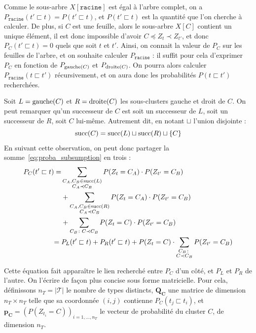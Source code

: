 Comme le sous-arbre $X[\texttt{racine}]$ est égal à l'arbre complet, on a $P_\texttt{racine}(t' \sqsubset t) = P(t' \sqsubset t)$, et $P(t' \sqsubset t)$ est la quantité que l'on cherche à calculer. De plus, si $C$ est une feuille, alors le sous-arbre $X[C]$ contient un unique élément, il est donc impossible d'avoir $C \preceq Z_t \prec Z_{t'}$, et donc $P_C(t' \sqsubset t) = 0$ quels que soit $t$ et $t'$. 
Ainsi, on connait la valeur de $P_C$ sur les feuilles de l'arbre, et on souhaite calculer $P_\texttt{racine}$ : il suffit pour cela d'exprimer $P_C$ en fonction de $P_{\operatorname{gauche}(C)}$ et $P_{\operatorname{droite}(C)}$. On pourra alors calculer $P_\texttt{racine}(t \sqsubset t')$ récursivement, et on aura donc les probabilités $P(t \sqsubset t')$ recherchées.

Soit $L = \operatorname{gauche}(C)$ et $R = \operatorname{droite}(C)$ les sous-clusters gauche et droit de $C$. On peut remarquer qu'un successeur de $C$ est soit un successeur de $L$, soit un successeur de $R$, soit $C$ lui-même. Autrement dit, en notant $\sqcup$ l'union disjointe :
\begin{equation}
    \operatorname{succ}(C) = \operatorname{succ}(L) \sqcup \operatorname{succ}(R) \sqcup \{ C\}
\end{equation}
En suivant cette observation, on peut donc partager la somme~\ref{eq:proba_subsumption} en trois :
\begin{align}
P_{C}(t' \sqsubset t) = 
&
\sum_{\substack{C_A, C_B \in \operatorname{succ}(L) \\  C_A \prec C_B}} P(Z_t = C_A)\cdot P(Z_{t'} = C_B) 
\nonumber \\ 
&+ 
\sum_{\substack{C_A, C_B \in \operatorname{succ}(R) \\  C_A \prec C_B}} P(Z_t = C_A)\cdot P(Z_{t'} = C_B) 
\nonumber \\
&+ \displaystyle \sum_{C_B \colon C \prec C_B} P(Z_t = C) \cdot P(Z_{t'} = C_B) \nonumber \\
= {} & P_{L}(t' \sqsubset t) + P_{R}(t' \sqsubset t)  + P(Z_t=C)\cdot\sum_{\substack{C_B \colon \\ C\prec C_B}} P(Z_{t'} = C_B)
\label{eq:proba_over_subtree}
\end{align}

Cette équation fait apparaître le lien recherché entre $P_C$ d'un côté, et $P_L$ et $P_R$ de l'autre. On l'écrire de façon plus concise sous forme matricielle. Pour cela, définissons $n_T = | \mathcal{T} |$ le nombre de types distincts, $\mathbf{Q_C}$ une matrice de dimension $n_T \times n_T$ telle que sa coordonnée $(i, j)$ contienne $P_C(t_j \sqsubset t_i)$, et $\mathbf{p_C} = \left(P(Z_{t_i} = C)\right)_{i = 1, \ldots, n_T}$ le vecteur de probabilité du cluster $C$, de dimension $n_T$. 

